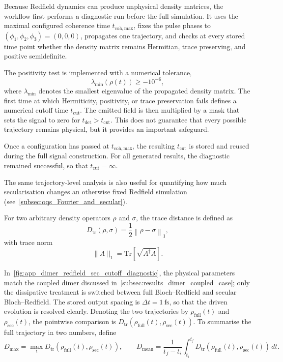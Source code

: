 Because Redfield dynamics can produce unphysical density matrices, the workflow
first performs a diagnostic run before the full simulation. It uses the maximal
configured coherence time \(t_{\mathrm{coh,max}}\), fixes the pulse phases to
\((\phi_1,\phi_2,\phi_3)=(0,0,0)\), propagates one trajectory, and checks at
every stored time point whether the density matrix remains Hermitian, trace
preserving, and positive semidefinite.

The positivity test is implemented with a numerical tolerance,
\[
\lambda_{\min}(\rho(t)) \ge -10^{-6},
\]
where \(\lambda_{\min}\) denotes the smallest eigenvalue of the propagated
density matrix. The first time at which Hermiticity, positivity, or trace
preservation fails defines a numerical cutoff time \(t_{\mathrm{cut}}\). The
emitted field is then multiplied by a mask that sets the signal to zero for
\(t_{\mathrm{det}} > t_{\mathrm{cut}}\). This does not guarantee that every
possible trajectory remains physical, but it provides an important safeguard.

Once a configuration has passed at \(t_{\mathrm{coh,max}}\), the resulting
\(t_{\mathrm{cut}}\) is stored and reused during the full signal construction.
For all generated results, the diagnostic remained successful, so that
\(t_{\mathrm{cut}}=\infty\).

The same trajectory-level analysis is also useful for quantifying how much
secularisation changes an otherwise fixed Redfield simulation
(see~\autoref{subsec:oqs_Fourier_and_secular}).

For two arbitrary density operators \(\rho\) and \(\sigma\), the trace distance
is defined as
\[
D_{\mathrm{tr}}(\rho,\sigma)
=
\frac{1}{2}\left\|\rho-\sigma\right\|_1,
\]
with trace norm
\[
\|A\|_1
=
\mathrm{Tr}\!\left[\sqrt{A^{\dagger}A}\right].
\]

In~\autoref{fig:app_dimer_redfield_sec_cutoff_diagnostic}, the physical
parameters match the coupled dimer discussed
in~\autoref{subsec:results_dimer_coupled_case}; only the dissipative treatment
is switched between full Bloch--Redfield and secular Bloch--Redfield. The
stored output spacing is \(\Delta t=\SI{1}{\femto\second}\), so that the driven
evolution is resolved clearly. Denoting the two trajectories by
\(\rho_{\mathrm{full}}(t)\) and \(\rho_{\mathrm{sec}}(t)\), the pointwise
comparison is
\(D_{\mathrm{tr}}(\rho_{\mathrm{full}}(t),\rho_{\mathrm{sec}}(t))\). To
summarise the full trajectory in two numbers, define
\[
D_{\max}
=
\max_t D_{\mathrm{tr}}(\rho_{\mathrm{full}}(t),\rho_{\mathrm{sec}}(t)),
\qquad
D_{\mathrm{mean}}
=
\frac{1}{t_f-t_i}\int_{t_i}^{t_f}
D_{\mathrm{tr}}(\rho_{\mathrm{full}}(t),\rho_{\mathrm{sec}}(t))\,dt.
\]


